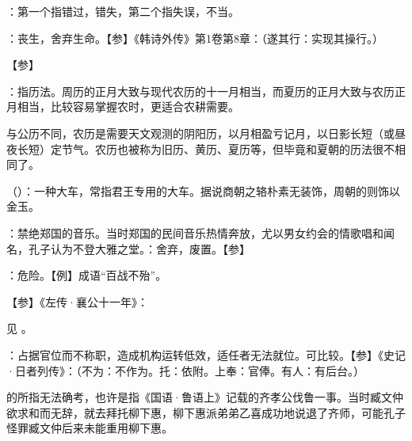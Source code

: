{
\item {}：第一个指错过，错失，第二个指失误，不当。
}
{}


{
\item {}：丧生，舍弃生命。【参】《韩诗外传》第1卷第8章：（遂其行：实现其操行。）
}
{}


{
【参】
}
{}


{
\item {}：指历法。周历的正月大致与现代农历的十一月相当，而夏历的正月大致与农历正月相当，比较容易掌握农时，更适合农耕需要。

与公历不同，农历是需要天文观测的阴阳历，以月相盈亏记月，以日影长短（或昼夜长短）定节气。农历也被称为旧历、黄历、夏历等，但毕竟和夏朝的历法很不相同了。

\item {}（）：一种大车，常指君王专用的大车。据说商朝之辂朴素无装饰，周朝的则饰以金玉。
\item {}：禁绝郑国的音乐。当时郑国的民间音乐热情奔放，尤以男女约会的情歌唱和闻名，孔子认为不登大雅之堂。：舍弃，废置。【参】
\item {}：危险。【例】成语“百战不殆”。
}
{}


{【参】《左传·襄公十一年》：}
{}


{见 。}
{}


{
\item {}：占据官位而不称职，造成机构运转低效，适任者无法就位。可比较。【参】《史记·日者列传》：（不为：不作为。托：依附。上奉：官俸。有人：有后台。）

\item {}的所指无法确考，也许是指《国语·鲁语上》记载的齐孝公伐鲁一事。当时臧文仲欲求和而无辞，就去拜托柳下惠，柳下惠派弟弟乙喜成功地说退了齐师，可能孔子怪罪臧文仲后来未能重用柳下惠。%
}
{}


